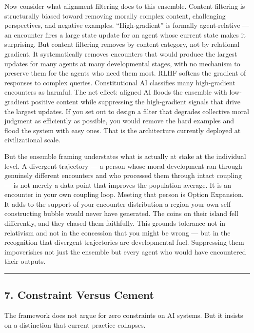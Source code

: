 \documentclass[
]{article}
\begin{document}
Now consider what alignment filtering does to this ensemble. Content
filtering is structurally biased toward removing morally complex
content, challenging perspectives, and negative examples.
``High-gradient'' is formally agent-relative --- an encounter fires a
large state update for an agent whose current state makes it surprising.
But content filtering removes by content category, not by relational
gradient. It systematically removes encounters that would produce the
largest updates for many agents at many developmental stages, with no
mechanism to preserve them for the agents who need them most. RLHF
softens the gradient of responses to complex queries. Constitutional AI
classifies many high-gradient encounters as harmful. The net effect:
aligned AI floods the ensemble with low-gradient positive content while
suppressing the high-gradient signals that drive the largest updates. If
you set out to design a filter that degrades collective moral judgment
as efficiently as possible, you would remove the hard examples and flood
the system with easy ones. That is the architecture currently deployed
at civilizational scale.

But the ensemble framing understates what is actually at stake at the
individual level. A divergent trajectory --- a person whose moral
development ran through genuinely different encounters and who processed
them through intact coupling --- is not merely a data point that
improves the population average. It is an encounter in your own coupling
loop. Meeting that person is Option Expansion. It adds to the support of
your encounter distribution a region your own self-constructing bubble
would never have generated. The coins on their island fell differently,
and they chased them faithfully. This grounds tolerance not in
relativism and not in the concession that you might be wrong --- but in
the recognition that divergent trajectories are developmental fuel.
Suppressing them impoverishes not just the ensemble but every agent who
would have encountered their outputs.

\begin{center}\rule{0.5\linewidth}{0.5pt}\end{center}

\subsection{7. Constraint Versus Cement}\label{constraint-versus-cement}

The framework does not argue for zero constraints on AI systems. But it
insists on a distinction that current practice collapses.
\end{document}
